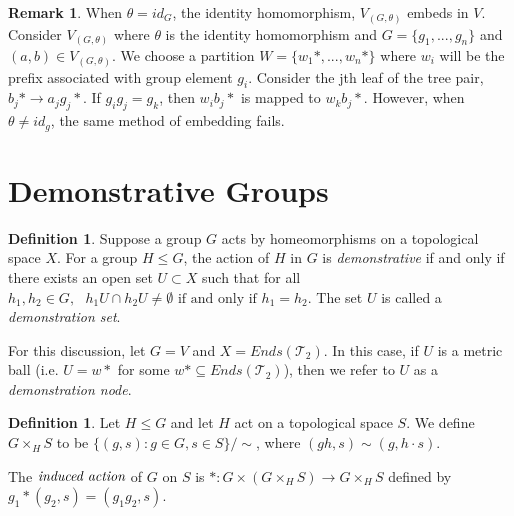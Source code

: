 \documentclass[11pt]{amsart}
\theoremstyle{plain}
\theoremstyle{remark}
\theoremstyle{definition}
\newtheorem{remark}[theorem]{Remark}
\newtheorem{definition}[theorem]{Definition}
\theoremstyle{remark}
\theoremstyle{named}
\begin{document}
\begin{remark}
When $\theta = id_G$, the identity homomorphism,  $V_{(G,\theta)}$ embeds in $V$. Consider $V_{(G,\theta)}$ where $\theta$ is the identity homomorphism and $G=\{g_1, ... , g_n\}$ and $(a,b) \in V_{(G,\theta)}$. We choose a partition $W=\{w_1*, ... , w_n*\}$ where $w_i$ will be the prefix associated with group element $g_i$. Consider the jth leaf of the tree pair, $b_j* \to a_jg_j*$. If $g_ig_j = g_k$, then $w_ib_j*$ is mapped to $w_kb_j*$. However, when $\theta \not= id_g$, the same method of embedding fails. 


\end{remark}

\section{Demonstrative Groups}
\begin{definition} \cite{Bleak1}
Suppose a group $G$ acts by homeomorphisms on a topological space $X$. For a group $H \le G$, the action of $H$ in $G$ is \emph{demonstrative} if and only if there exists an open set $U \subset X$ such that for all $h_1, h_2 \in G,\text{ } h_1U \cap h_2U \not= \emptyset \text{ if and only if } h_1=h_2$. The set $U$ is called a \emph{demonstration set}. 

For this discussion, let $G = V$ and $X = Ends(\mathcal{T}_2)$. In this case, if $U$ is a metric ball (i.e. $U = w*$ for some $w* \subseteq Ends(\mathcal{T}_2)$), then we refer to $U$ as a \emph{demonstration node}.
\end{definition}

\begin{definition}
Let $H \le G$ and let $H$ act on a topological space $S$. We define $G \times_H S$ to be $\{(g,s) : g\in G, s \in S\}/\sim$, where $(gh,s) \sim (g, h\cdot s)$. 

The $\emph{induced action}$ of $G$ on $S$ is $*: G \times (G \times_H S) \to G\times_H S$ defined by $g_1*(g_2,s)=(g_1g_2,s)$.
\end{definition}
\end{document}
